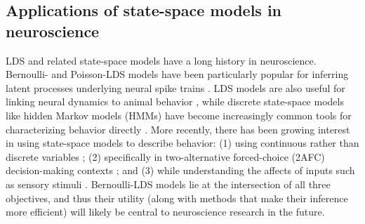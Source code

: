 \subsection{Applications of state-space models in neuroscience}
\label{sec:bestlds:background:applications}

LDS and related state-space models have a long history in neuroscience. Bernoulli- and Poisson-LDS models have been particularly popular for inferring latent processes underlying neural spike trains \cite{gao_high-dimensional_2015, nonnenmacher_extracting_2017, zoltowski_general_2020, valente_probing_2022}. LDS models are also useful for linking neural dynamics to animal behavior \cite{linderman_hierarchical_2019}, while discrete state-space models like hidden Markov models (HMMs) have become increasingly common tools for characterizing behavior directly \cite{wiltschko_mapping_2015, calhoun_unsupervised_2019, wiltschko_revealing_2020}. More recently, there has been growing interest in using state-space models to describe behavior: (1) using  continuous rather than discrete variables \cite{johnson_composing_2016, costacurta_distinguishing_2022}; (2) specifically in two-alternative forced-choice (2AFC) decision-making contexts \cite{roy_extracting_2021};  and (3) while understanding the affects of inputs such as sensory stimuli \cite{calhoun_unsupervised_2019, bolkan_opponent_2022, ashwood_mice_2022}. Bernoulli-LDS models lie at the intersection of all three objectives, and thus their utility (along with methods that make their inference more efficient) will likely be central to neuroscience research in the future.
